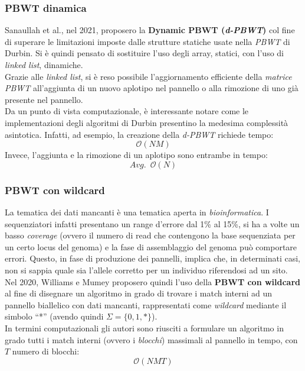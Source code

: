 \subsubsection{PBWT dinamica}
Sanaullah et al., nel 2021, proposero la \textbf{Dynamic PBWT (\textit{d-PBWT})}
\cite{dpbwt} col fine di superare le limitazioni imposte dalle strutture
statiche usate nella \textit{PBWT} di Durbin. Si è quindi pensato di sostituire
l'uso degli array, statici, con l'uso di \textit{linked list}, dinamiche.\\
Grazie alle \textit{linked list}, si è reso possibile l'aggiornamento
efficiente della \textit{matrice PBWT} all'aggiunta di un nuovo aplotipo nel
pannello o alla rimozione di uno già presente nel pannello.\\
Da un punto di vista computazionale, è interessante notare come le
implementazioni degli algoritmi di Durbin presentino la medesima complessità
asintotica. Infatti, ad esempio, la creazione della \textit{d-PBWT} richiede
tempo:
\begin{equation}
  \label{eq:dpbwt}
  \mathcal{O}(NM)
\end{equation}
Invece, l'aggiunta e la rimozione di un aplotipo sono entrambe in tempo:
\begin{equation}
  \label{eq:dpbwt1}
  Avg.\,\,\,\mathcal{O}(N)
\end{equation}
\subsubsection{PBWT con wildcard}
La tematica dei dati mancanti è una tematica aperta in
\textit{bioinformatica}. I sequenziatori infatti presentano un range d'errore
dal 1\% al 15\%, si ha a volte un basso \textit{coverage} (ovvero il numero di
read che contengono la base sequenziata per un certo locus del genoma) e la fase
di assemblaggio del genoma può comportare errori. Questo, in fase di produzione
dei pannelli, implica che, in determinati casi, non si sappia quale sia l'allele
corretto per un individuo riferendosi ad un sito. \\
Nel 2020, Williams e Mumey \cite{williams} proposero quindi l'uso della
\textbf{PBWT con 
  wildcard} al fine di disegnare un algoritmo in grado di trovare i match
interni ad un pannello biallelico con dati mancanti, rappresentati come
\textit{wildcard} mediante il simbolo ``*'' (avendo quindi
$\Sigma=\{0,1,*\}$).\\ 
In termini computazionali gli autori sono riusciti a formulare un algoritmo in
grado tutti i match interni (ovvero i \textit{blocchi}) massimali al pannello in
tempo, con $T$ numero di blocchi: 
\begin{equation}
  \label{eq:pbwtwild}
  \mathcal{O}(NMT)
\end{equation}
